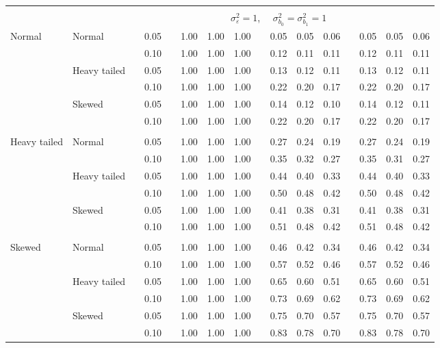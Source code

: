 \begin{table}[ht]
\begin{scriptsize}
\begin{center}
\begin{tabular}{ll p{.1cm} c p{.1cm} rrr p{.1cm} rrr p{.1cm} rrr}
&&&&&&&&&&&&&&&\\
& && && \multicolumn{9}{c}{$\sigma_{\varepsilon}^2 = 1$, \ \ $\sigma_{b_0}^2 = \sigma_{b_1}^2 = 1$} \\ \cline{6-16}

\rowcolor{gray!20} Normal       & Normal       && 0.05 &&  1.00 & 1.00 & 1.00 && 0.05 & 0.05 & 0.06 && 0.05 & 0.05 & 0.06 \\ 
\rowcolor{gray!20}             &              && 0.10 &&  1.00 & 1.00 & 1.00 && 0.12 & 0.11 & 0.11 && 0.12 & 0.11 & 0.11 \\ 
\rowcolor{gray!20}             & Heavy tailed && 0.05 &&  1.00 & 1.00 & 1.00 && 0.13 & 0.12 & 0.11 && 0.13 & 0.12 & 0.11 \\ 
\rowcolor{gray!20}             &              && 0.10 &&  1.00 & 1.00 & 1.00 && 0.22 & 0.20 & 0.17 && 0.22 & 0.20 & 0.17 \\ 
\rowcolor{gray!20}             & Skewed       && 0.05 &&  1.00 & 1.00 & 1.00 && 0.14 & 0.12 & 0.10 && 0.14 & 0.12 & 0.11 \\ 
\rowcolor{gray!20}             &              && 0.10 &&  1.00 & 1.00 & 1.00 && 0.22 & 0.20 & 0.17 && 0.22 & 0.20 & 0.17 \\
             &&&&&&&&&&&&&&&\\ 
Heavy tailed & Normal       && 0.05 &&  1.00 & 1.00 & 1.00 && 0.27 & 0.24 & 0.19 && 0.27 & 0.24 & 0.19 \\ 
             &              && 0.10 &&  1.00 & 1.00 & 1.00 && 0.35 & 0.32 & 0.27 && 0.35 & 0.31 & 0.27 \\ 
             & Heavy tailed && 0.05 &&  1.00 & 1.00 & 1.00 && 0.44 & 0.40 & 0.33 && 0.44 & 0.40 & 0.33 \\ 
             &              && 0.10 &&  1.00 & 1.00 & 1.00 && 0.50 & 0.48 & 0.42 && 0.50 & 0.48 & 0.42 \\ 
             & Skewed       && 0.05 &&  1.00 & 1.00 & 1.00 && 0.41 & 0.38 & 0.31 && 0.41 & 0.38 & 0.31 \\ 
             &              && 0.10 &&  1.00 & 1.00 & 1.00 && 0.51 & 0.48 & 0.42 && 0.51 & 0.48 & 0.42 \\ 
             &&&&&&&&&&&&&&&\\
Skewed       & Normal       && 0.05 &&  1.00 & 1.00 & 1.00 && 0.46 & 0.42 & 0.34 && 0.46 & 0.42 & 0.34 \\ 
             &              && 0.10 &&  1.00 & 1.00 & 1.00 && 0.57 & 0.52 & 0.46 && 0.57 & 0.52 & 0.46 \\ 
             & Heavy tailed && 0.05 &&  1.00 & 1.00 & 1.00 && 0.65 & 0.60 & 0.51 && 0.65 & 0.60 & 0.51 \\ 
             &              && 0.10 &&  1.00 & 1.00 & 1.00 && 0.73 & 0.69 & 0.62 && 0.73 & 0.69 & 0.62 \\ 
             & Skewed       && 0.05 &&  1.00 & 1.00 & 1.00 && 0.75 & 0.70 & 0.57 && 0.75 & 0.70 & 0.57 \\ 
             &              && 0.10 &&  1.00 & 1.00 & 1.00 && 0.83 & 0.78 & 0.70 && 0.83 & 0.78 & 0.70 \\ 



\end{tabular}
\end{center}
\end{scriptsize}
\end{table}
